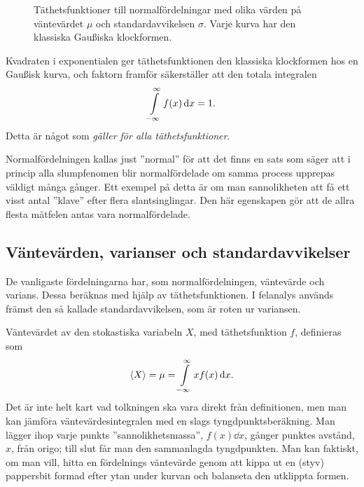 \documentclass[11pt,a4paper, swedish
]{article}
\newcounter{exempel_counter}%
\begin{document}
\begin{figure}
\centering

\caption{Täthetsfunktioner till normalfördelningar med olika värden på
väntevärdet $\mu$ och standardavvikelsen $\sigma$. Varje kurva har den
klassiska Gau\ss{}iska klockformen.}\label{fig:normal_dist}
\end{figure}

Kvadraten i exponentialen ger täthetsfunktionen den
klassiska klockformen hos en Gau\ss{}isk kurva, och faktorn framför
säkerställer att den totala integralen
\begin{equation}
\int_{-\infty}^{\infty} f(x)\id{x} = 1.
\end{equation}
Detta är något som \emph{gäller för alla täthetsfunktioner}. 

Normalfördelningen kallas just ''normal'' för att det finns en sats
som säger att i princip alla slumpfenomen blir normalfördelade om
samma process upprepas väldigt många gånger. Ett exempel på detta är
om man sannolikheten att få ett visst antal ''klave'' efter flera
slantsinglingar. Den här egenskapen gör att de allra flesta 
mätfelen antas vara normalfördelade.



\subsection{Väntevärden, varianser och standardavvikelser}
De vanligaste fördelningarna har, som normalfördelningen, väntevärde
och varians. Dessa beräknas med hjälp av täthetsfunktionen. I
felanalys används främst den så kallade standardavvikelsen, som 
är roten ur variansen.

Väntevärdet av den stokastiska variabeln $X$, med täthetsfunktion $f$,
definieras som 
\begin{equation}\label{eq:ev}
\ev{X} = \mu = \int_{-\infty}^\infty x f(x)\id{x}.
\end{equation}
Det är inte helt kart vad tolkningen ska vara direkt från
definitionen, men man kan jämföra väntevärdesintegralen med en slags
tyngdpunktsberäkning. Man lägger ihop varje punkts
''sannolikhetsmassa'', $f(x)\dd{x}$, gånger punktes avstånd, $x$, från
origo; till slut får man den sammanlagda tyngdpunkten. Man kan
faktiskt, om man vill, hitta en fördelnings väntevärde genom att kippa
ut en (styv) pappersbit formad efter ytan under kurvan och balanseta
den utklippta formen. 
\end{document}
